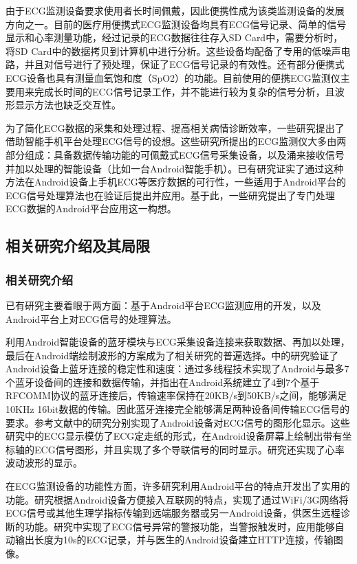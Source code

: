 由于ECG监测设备要求使用者长时间佩戴，因此便携性成为该类监测设备的发展方向之一。目前的医疗用便携式ECG监测设备均具有ECG信号记录、简单的信号显示和心率测量功能，经过记录的ECG数据往往存入SD Card中，需要分析时，将SD Card中的数据拷贝到计算机中进行分析。这些设备均配备了专用的低噪声电路，并且对信号进行了预处理，保证了ECG信号记录的有效性。还有部分便携式ECG设备也具有测量血氧饱和度（SpO2）的功能。目前使用的便携ECG监测仪主要用来完成长时间的ECG信号记录工作，并不能进行较为复杂的信号分析，且波形显示方法也缺乏交互性。

为了简化ECG数据的采集和处理过程、提高相关病情诊断效率，一些研究提出了借助智能手机平台处理ECG信号的设想。这些研究所提出的ECG监测仪大多由两部分组成：具备数据传输功能的可佩戴式ECG信号采集设备，以及涌来接收信号并加以处理的智能设备（比如一台Android智能手机）。已有研究证实了通过这种方法在Android设备上手机ECG等医疗数据的可行性，一些适用于Android平台的ECG信号处理算法也在验证后提出并应用。基于此，一些研究提出了专门处理ECG数据的Android平台应用这一构想。

\subsection{相关研究介绍及其局限}
\subsubsection{相关研究介绍}

已有研究主要着眼于两方面：基于Android平台ECG监测应用的开发，以及Android平台上对ECG信号的处理算法。

利用Android智能设备的蓝牙模块与ECG采集设备连接来获取数据、再加以处理，最后在Android端绘制波形的方案成为了相关研究的普遍选择。\cite{tang_android_2015}中的研究验证了Android设备上蓝牙连接的稳定性和速度：通过多线程技术实现了Android与最多7个蓝牙设备间的连接和数据传输，并指出在Android系统建立了4到7个基于RFCOMM协议的蓝牙连接后，传输速率保持在20KB/s到50KB/s之间，能够满足10KHz 16bit数据的传输。因此蓝牙连接完全能够满足两种设备间传输ECG信号的要求。参考文献\cite{moreno_android_2012}\cite{lou_wireless_2013}\cite{guo_ecg_2013}中的研究分别实现了Android设备对ECG信号的图形化显示。这些研究中的ECG显示模仿了ECG定走纸的形式，在Android设备屏幕上绘制出带有坐标轴的ECG信号图形，并且实现了多个导联信号的同时显示。研究\cite{guo_ecg_2013}还实现了心率波动波形的显示。

在ECG监测设备的功能性方面，许多研究利用Android平台的特点开发出了实用的功能。研究\cite{lou_wireless_2013}\cite{guo_ecg_2013}根据Android设备方便接入互联网的特点，实现了通过WiFi/3G网络将ECG信号或其他生理学指标传输到远端服务器或另一Android设备，供医生远程诊断的功能。研究\cite{guo_ecg_2013}中实现了ECG信号异常的警报功能，当警报触发时，应用能够自动输出长度为10s的ECG记录，并与医生的Android设备建立HTTP连接，传输图像。

